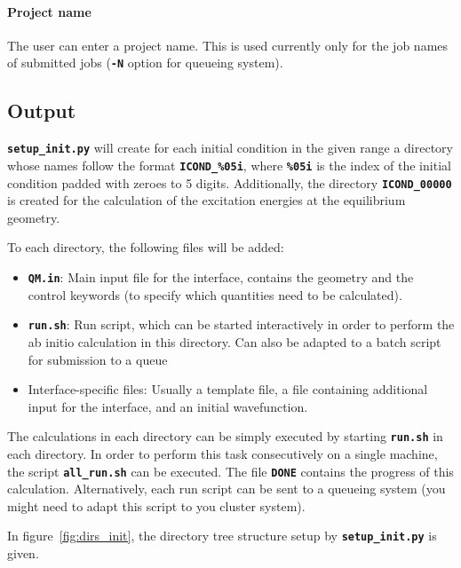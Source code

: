 \documentclass[a4paper,11pt,DIV=15,openany,twoside=false]{scrbook}
\newcommand{\ttt}[1]{\textbf{\texttt{#1}}}
\begin{document}
\paragraph{Project name}

The user can enter a project name. This is used currently only for the job names of submitted jobs (\ttt{-N} option for queueing system).

\subsection{Output}

\ttt{setup\_init.py} will create for each initial condition in the given range a directory whose names follow the format \ttt{ICOND\_\%05i}, where \ttt{\%05i} is the index of the initial condition padded with zeroes to 5 digits. Additionally, the directory \ttt{ICOND\_00000} is created for the calculation of the excitation energies at the equilibrium geometry.

To each directory, the following files will be added:
\begin{itemize}
  \item \ttt{QM.in}: Main input file for the interface, contains the geometry and the control keywords (to specify which quantities need to be calculated). 
  \item \ttt{run.sh}: Run script, which can be started interactively in order to perform the ab initio calculation in this directory. Can also be adapted to a batch script for submission to a queue 
  \item Interface-specific files: Usually a template file, a file containing additional input for the interface, and an initial wavefunction.
\end{itemize}

The calculations in each directory can be simply executed by starting \ttt{run.sh} in each directory. In order to perform this task consecutively on a single machine, the script \ttt{all\_run.sh} can be executed. The file \ttt{DONE} contains the progress of this calculation.
Alternatively, each run script can be sent to a queueing system (you might need to adapt this script to you cluster system).

In figure~\ref{fig:dirs_init}, the directory tree structure setup by \ttt{setup\_init.py} is given.
\end{document}
